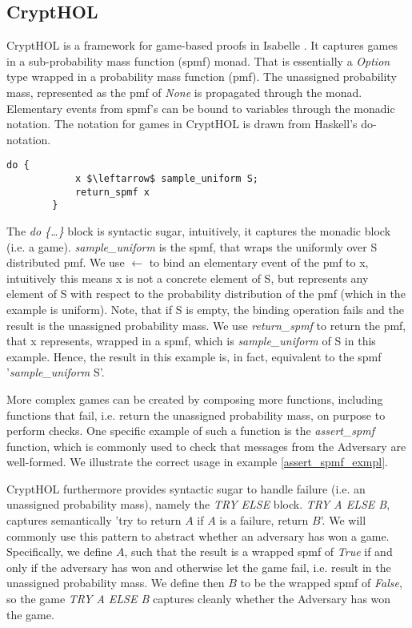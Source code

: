 \subsection{CryptHOL}
CryptHOL is a framework for game-based proofs in Isabelle \parencite{CryptHOL_game_based}. It captures games in a sub-probability mass function (spmf) monad. That is essentially a \textit{Option} type wrapped in a probability mass function (pmf). The unassigned probability mass, represented as the pmf of \textit{None} is propagated through the monad.
Elementary events from spmf's can be bound to variables through the monadic notation. 
The notation for games in CryptHOL is drawn from Haskell's do-notation.  
\begin{example}
    \hspace{0mm}
    \begin{lstlisting}[language=isabelle]
        do {
            x $\leftarrow$ sample_uniform S;
            return_spmf x
        }
    \end{lstlisting}

    The \textit{do \{\dots\}} block is syntactic sugar, intuitively, it captures the monadic block (i.e. a game).
    \textit{sample\_uniform} is the spmf, that wraps the uniformly over S distributed pmf.
    We use $\leftarrow$ to bind an elementary event of the pmf to x, intuitively this means x is not a concrete element of S, but represents any element of S with respect to the probability distribution of the pmf (which in the example is uniform). Note, that if S is empty, the binding operation fails and the result is the unassigned probability mass. 
    We use \textit{return\_spmf} to return the pmf, that x represents, wrapped in a spmf, which is \textit{sample\_uniform} of S in this example. Hence, the result in this example is, in fact, equivalent to the spmf '\textit{sample\_uniform} S'.
\end{example}

More complex games can be created by composing more functions, including functions that fail, i.e. return the unassigned probability mass, on purpose to perform checks. One specific example of such a function is the \textit{assert\_spmf} function, which is commonly used to check that messages from the Adversary are well-formed. We illustrate the correct usage in example \ref{assert_spmf_exmpl}. 

CryptHOL furthermore provides syntactic sugar to handle failure (i.e. an unassigned probability mass), namely the \textit{TRY ELSE} block. \textit{TRY A ELSE B}, captures semantically 'try to return $A$ if $A$ is a failure, return $B$'. We will commonly use this pattern to abstract whether an adversary has won a game. Specifically, we define $A$, such that the result is a wrapped spmf of \textit{True} if and only if the adversary has won and otherwise let the game fail, i.e. result in the unassigned probability mass. We define then $B$ to be the wrapped spmf of \textit{False}, so the game \textit{TRY A ELSE B} captures cleanly whether the Adversary has won the game.

